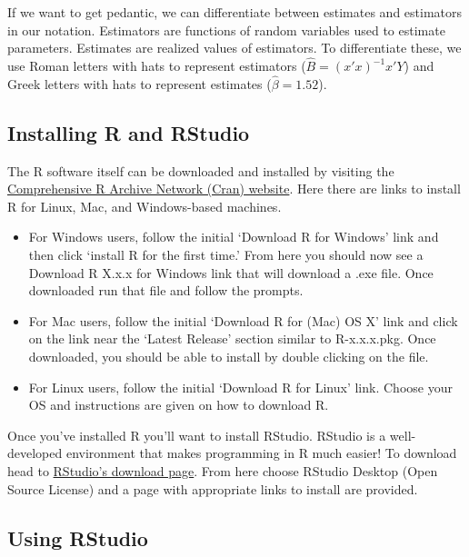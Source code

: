 \documentclass[
]{book}
\theoremstyle{definition}
\theoremstyle{definition}
\theoremstyle{definition}
\theoremstyle{remark}
\begin{document}
If we want to get pedantic, we can differentiate between estimates and estimators in our notation. Estimators are functions of random variables used to estimate parameters. Estimates are realized values of estimators. To differentiate these, we use Roman letters with hats to represent estimators (\(\hat B = (x'x )^{-1}x'Y\)) and Greek letters with hats to represent estimates (\(\hat \beta = 1.52\)).

\hypertarget{installing-r-and-rstudio-1}{%
\subsection{Installing R and RStudio}\label{installing-r-and-rstudio-1}}

The R software itself can be downloaded and installed by visiting the \href{https://cran.r-project.org/}{Comprehensive R Archive Network (Cran) website}. Here there are links to install R for Linux, Mac, and Windows-based machines.

\begin{itemize}
\item
  For Windows users, follow the initial `Download R for Windows' link and then click `install R for the first time.' From here you should now see a Download R X.x.x for Windows link that will download a .exe file. Once downloaded run that file and follow the prompts.
\item
  For Mac users, follow the initial `Download R for (Mac) OS X' link and click on the link near the `Latest Release' section similar to R-x.x.x.pkg. Once downloaded, you should be able to install by double clicking on the file.
\item
  For Linux users, follow the initial `Download R for Linux' link. Choose your OS and instructions are given on how to download R.
\end{itemize}

Once you've installed R you'll want to install RStudio. RStudio is a well-developed environment that makes programming in R much easier! To download head to \href{https://rstudio.com/products/rstudio/download/}{RStudio's download page}. From here choose RStudio Desktop (Open Source License) and a page with appropriate links to install are provided.

\hypertarget{using-rstudio-1}{%
\subsection{Using RStudio}\label{using-rstudio-1}}
\end{document}
